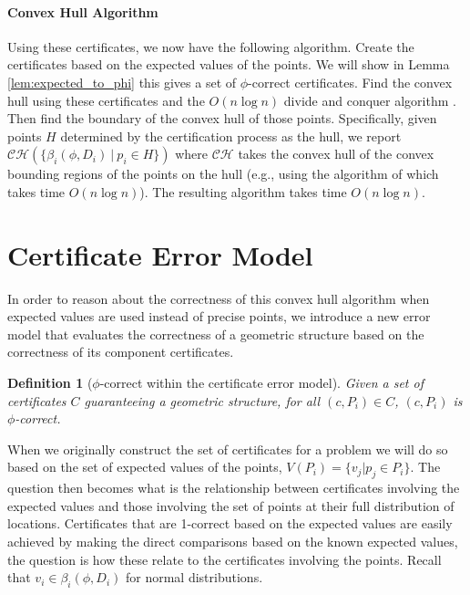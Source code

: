 \documentclass[11pt]{article}
\newtheorem{definition}[theorem]{Definition}
\begin{document}
\paragraph*{Convex Hull Algorithm} 
Using these certificates, we now have the following algorithm.  Create the certificates based on the expected values of the points.  We will show in Lemma \ref{lem:expected_to_phi} this gives a set of $\phi$-correct certificates.  Find the convex hull using these certificates and the $O(n \log n)$ divide and conquer algorithm \cite{Basch99MobileData}.  Then find the boundary of the convex hull of those points.  Specifically, given points $H$ determined by the certification process as the hull, we report $\mathcal{CH}(\{\beta_i(\phi, D_i) ~|~ p_i \in H\})$ where $\mathcal{CH}$ takes the convex hull of the convex bounding regions of the points on the hull (e.g., using the algorithm of \cite{devillers95incremental} which takes time $O(n \log n)$).  The resulting algorithm takes time $O(n \log n)$.


 \section{Certificate Error Model}
\label{certificate_error_model}
In order to reason about the correctness of this convex hull algorithm when expected values are used instead of precise points, we introduce a new error model that evaluates the correctness of a geometric structure based on the correctness of its component certificates.

\begin{definition}[$\phi$-correct within the certificate error model]
  Given a set of certificates $C$ guaranteeing a
  geometric structure, for all $(c,P_i) \in C$, $(c,P_i)$ is
  $\phi$-correct.
\end{definition}

When we originally construct the set of certificates for a problem we will do so based on the set of expected values of the points, $V(P_i) = \{ v_{j} | p_j \in P_i \}$.  The question then becomes what is the relationship between certificates involving the expected values and those involving the set of points at their full distribution of locations.  Certificates that are 1-correct based on the expected values are easily achieved by making the direct comparisons based on the known expected values, the question is how these relate to the certificates involving the points. 
Recall that $v_i \in \beta_i(\phi, D_i)$ for normal distributions.
\end{document}
